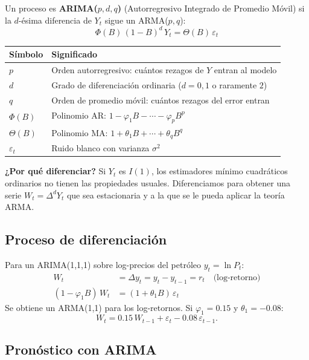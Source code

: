 \documentclass[12pt,a4paper]{article}
\theoremstyle{definition}
\begin{document}
\begin{defbox}[ARIMA($p,d,q$)]
Un proceso es \textbf{ARIMA($p,d,q$)} (Autorregresivo Integrado de Promedio
Móvil) si la $d$-ésima diferencia de $Y_t$ sigue un ARMA($p,q$):
\[
  \boxed{\Phi(B)\,(1-B)^d\,Y_t = \Theta(B)\,\varepsilon_t}
\]
\begin{center}
\begin{tabular}{ll}
\toprule
Símbolo & Significado \\
\midrule
$p$ & Orden autorregresivo: cuántos rezagos de $Y$ entran al modelo \\
$d$ & Grado de diferenciación ordinaria ($d=0,1$ o raramente $2$) \\
$q$ & Orden de promedio móvil: cuántos rezagos del error entran \\
$\Phi(B)$ & Polinomio AR: $1 - \varphi_1 B - \cdots - \varphi_p B^p$ \\
$\Theta(B)$ & Polinomio MA: $1 + \theta_1 B + \cdots + \theta_q B^q$ \\
$\varepsilon_t$ & Ruido blanco con varianza $\sigma^2$ \\
\bottomrule
\end{tabular}
\end{center}
\end{defbox}

\noindent\textbf{¿Por qué diferenciar?}  Si $Y_t$ es $I(1)$, los estimadores
mínimo cuadráticos ordinarios no tienen las propiedades usuales. Diferenciamos
para obtener una serie $W_t = \Delta^d Y_t$ que sea estacionaria y a la que
se le pueda aplicar la teoría ARMA.

\subsection{Proceso de diferenciación}

Para un ARIMA(1,1,1) sobre log-precios del petróleo $y_t = \ln P_t$:
\begin{align*}
  W_t &= \Delta y_t = y_t - y_{t-1} = r_t \quad \text{(log-retorno)}\\
  (1 - \varphi_1 B)\,W_t &= (1+\theta_1 B)\,\varepsilon_t
\end{align*}
Se obtiene un ARMA(1,1) para los log-retornos. Si $\varphi_1 = 0.15$ y
$\theta_1 = -0.08$:
\[
  W_t = 0.15\,W_{t-1} + \varepsilon_t - 0.08\,\varepsilon_{t-1}.
\]

\subsection{Pronóstico con ARIMA}
\end{document}
